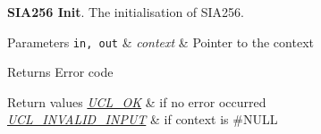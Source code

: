 {\bfseries S\+I\+A256 Init}. The initialisation of S\+I\+A256.


\begin{DoxyParams}[1]{Parameters}
\mbox{\tt in, out}  & {\em context} & Pointer to the context\\
\hline
\end{DoxyParams}
\begin{DoxyReturn}{Returns}
Error code
\end{DoxyReturn}

\begin{DoxyRetVals}{Return values}
{\em \hyperlink{group___u_c_l___r_e_t_u_r_n_gaf4aeb5212f5aa1b3a12b3dea7eb1785d}{U\+C\+L\+\_\+\+OK}} & if no error occurred \\
\hline
{\em \hyperlink{group___u_c_l___r_e_t_u_r_n_ga0ce984d38effddf33eb42be5ff3d87cf}{U\+C\+L\+\_\+\+I\+N\+V\+A\+L\+I\+D\+\_\+\+I\+N\+P\+UT}} & if {\ttfamily context} is \#\+N\+U\+LL \\
\hline
\end{DoxyRetVals}
